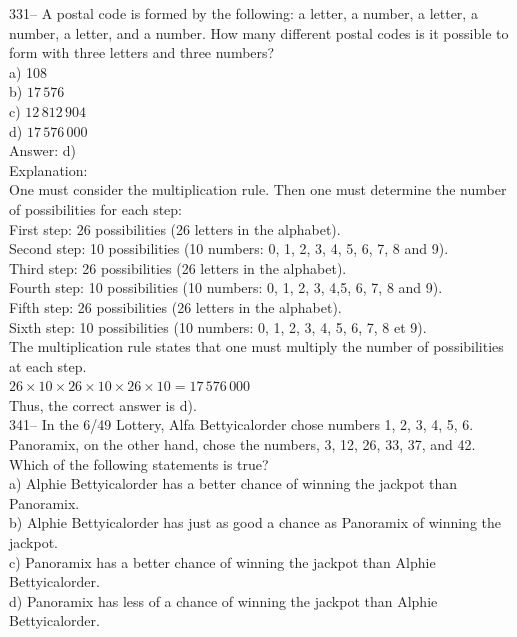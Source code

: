 \documentclass[letterpaper, 12pt]{article}
\begin{document}
331-- A postal code is formed by the following: a letter, a number, a letter, a number, a letter, and a number.
How many different postal codes is it possible to form with three letters and three numbers?\\

a) 108\\
b) $17\,576$\\
c) $12\,812\,904$\\
d) $17\,576\,000$\\

Answer: d)\\

Explanation: \\
One must consider the multiplication rule.  Then one must determine the number of possibilities for each step:\\
First step: 26 possibilities (26 letters in the alphabet).\\
Second step: 10 possibilities (10 numbers: 0, 1, 2, 3, 4, 5,
6, 7, 8 and 9).\\
Third step: 26 possibilities (26 letters in the alphabet).\\
Fourth step: 10 possibilities (10 numbers: 0, 1, 2, 3, 4,5,
6, 7, 8 and 9).\\
Fifth step: 26 possibilities (26 letters in the alphabet).\\
Sixth step: 10 possibilities (10 numbers: 0, 1, 2, 3, 4, 5,
6, 7, 8 et 9).\\
The multiplication rule states that one must multiply the number of possibilities at each step.\\
$26\times10\times26\times10\times26\times10=17\,576\,000$\\
Thus, the correct answer is d).\\



341-- In the 6/49 Lottery, Alfa Bettyicalorder chose numbers 1, 2, 3, 4, 5, 6.
Panoramix, on the other hand, chose the numbers, 3, 12, 26, 33, 37, and 42.
Which of the following statements is true?\\

a) Alphie Bettyicalorder has a better chance of winning the jackpot than Panoramix.\\
b) Alphie Bettyicalorder has just as good a chance as Panoramix of winning the jackpot.\\
c) Panoramix has a better chance of winning the jackpot than Alphie Bettyicalorder.\\
d) Panoramix has less of a chance of winning the jackpot than Alphie Bettyicalorder.\\
\end{document}
